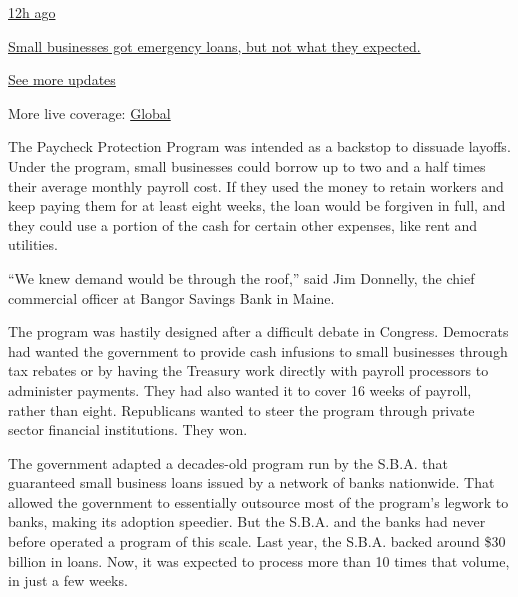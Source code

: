 \href{https://www.nytimes.com/live/2020/08/03/business/stock-market-today-coronavirus?action=click\&pgtype=Article\&state=default\&region=MAIN_CONTENT_1\&context=storylines_live_updates\#small-businesses-got-emergency-loans-but-not-what-they-expected}{12h
ago}

\href{https://www.nytimes.com/live/2020/08/03/business/stock-market-today-coronavirus?action=click\&pgtype=Article\&state=default\&region=MAIN_CONTENT_1\&context=storylines_live_updates\#small-businesses-got-emergency-loans-but-not-what-they-expected}{Small
businesses got emergency loans, but not what they expected.}

\href{https://www.nytimes.com/live/2020/08/03/business/stock-market-today-coronavirus?action=click\&pgtype=Article\&state=default\&region=MAIN_CONTENT_1\&context=storylines_live_updates}{See
more updates}

More live coverage:
\href{https://www.nytimes.com/2020/08/03/world/coronavirus-covid-19.html?action=click\&pgtype=Article\&state=default\&region=MAIN_CONTENT_1\&context=storylines_live_updates}{Global}

The Paycheck Protection Program was intended as a backstop to dissuade
layoffs. Under the program, small businesses could borrow up to two and
a half times their average monthly payroll cost. If they used the money
to retain workers and keep paying them for at least eight weeks, the
loan would be forgiven in full, and they could use a portion of the cash
for certain other expenses, like rent and utilities.

``We knew demand would be through the roof,'' said Jim Donnelly, the
chief commercial officer at Bangor Savings Bank in Maine.

The program was hastily designed after a difficult debate in Congress.
Democrats had wanted the government to provide cash infusions to small
businesses through tax rebates or by having the Treasury work directly
with payroll processors to administer payments. They had also wanted it
to cover 16 weeks of payroll, rather than eight. Republicans wanted to
steer the program through private sector financial institutions. They
won.

The government adapted a decades-old program run by the S.B.A. that
guaranteed small business loans issued by a network of banks nationwide.
That allowed the government to essentially outsource most of the
program's legwork to banks, making its adoption speedier. But the S.B.A.
and the banks had never before operated a program of this scale. Last
year, the S.B.A. backed around \$30 billion in loans. Now, it was
expected to process more than 10 times that volume, in just a few weeks.

